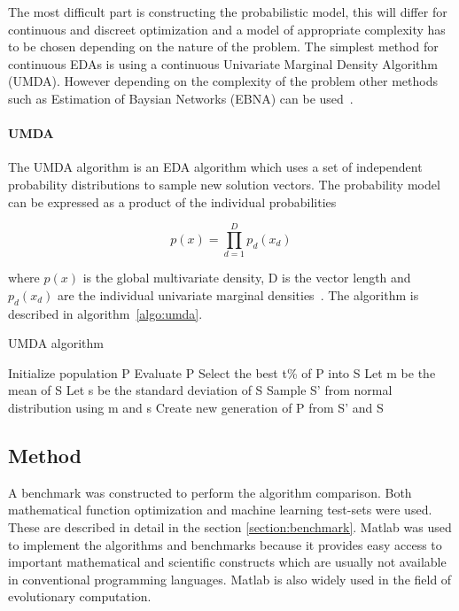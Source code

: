 The most difficult part is constructing the probabilistic model, this will differ for continuous and discreet optimization and a model of appropriate complexity has to be chosen depending on the nature of the problem. The simplest method for continuous EDAs is using a continuous Univariate Marginal Density Algorithm (UMDA). However depending on the complexity of the problem other methods such as Estimation of Baysian Networks (EBNA) can be used~\cite{larranaga2012review}.

\paragraph{UMDA}
The UMDA algorithm is an EDA algorithm which uses a set of independent probability distributions to sample new solution vectors. The probability model can be expressed as a product of the individual probabilities

\begin{equation}
  p(x) = \prod _{d=1}^D {p_d(x_d)}
\end{equation}

where $p(x)$ is the global multivariate density, D is the vector length and $p_d(x_d)$ are the individual univariate marginal densities~\cite{povsik2004estimation}. The algorithm is described in algorithm~\ref{algo:umda}.

\begin{algorithm}[h]
  \caption{UMDA algorithm}
  \label{algo:umda}

    \begin{algorithmic}
      \State Initialize population P
      \Repeat
        \State Evaluate P
        \State Select the best t\% of P into S
        \State Let m be the mean of S
        \State Let s be the standard deviation of S
        \State Sample S' from normal distribution using m and s
        \State Create new generation of P from S' and S
    \end{algorithmic}

\end{algorithm}

\subsection{Method}

A benchmark was constructed to perform the algorithm comparison. Both mathematical function optimization and machine learning test-sets were used. These are described in detail in the section \ref{section:benchmark}. Matlab was used to implement the algorithms and benchmarks because it provides easy access to important mathematical and scientific constructs which are usually not available in conventional programming languages. Matlab is also widely used in the field of evolutionary computation.
